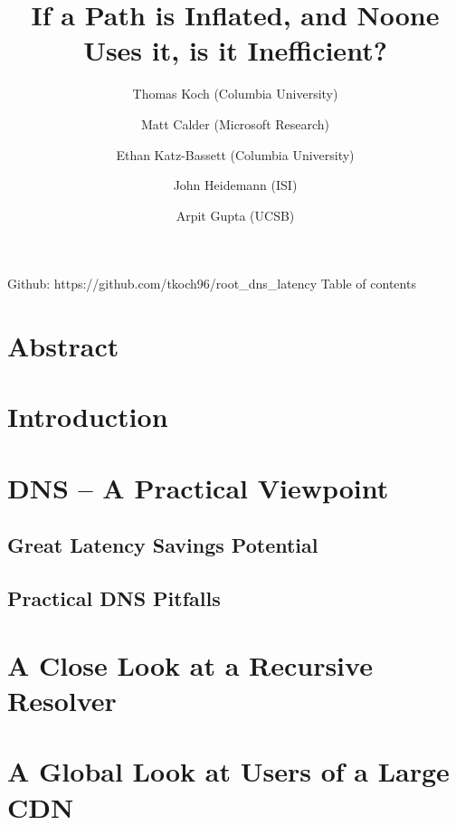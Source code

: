 \documentclass[sigconf,nonacm,10pt]{acmart}
\title{If a Path is Inflated, and Noone Uses it, is it Inefficient?}
\author{
            Thomas Koch (Columbia University)
         \and 
            Matt Calder (Microsoft Research)
         \and 
            Ethan Katz-Bassett (Columbia University)
         \and 
            John Heidemann (ISI)
         \and 
            Arpit Gupta (UCSB)
        }
\date{}
\begin{document}
\maketitle

\iffalse

Github: https://github.com/tkoch96/root\_dns\_latency Table of contents

\section*{Abstract}\label{abstract}

\section{Introduction}\label{introduction}

\section{DNS -- A Practical Viewpoint}\label{dns-a-practical-viewpoint}

\subsection{Great Latency Savings
Potential}\label{great-latency-savings-potential}

\subsection{Practical DNS Pitfalls}\label{practical-dns-pitfalls}

\section{A Close Look at a Recursive
Resolver}\label{a-close-look-at-a-recursive-resolver}

\section{A Global Look at Users of a Large
CDN}\label{a-global-look-at-users-of-a-large-cdn}
\end{document}
